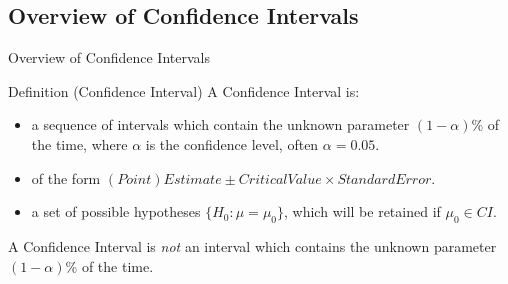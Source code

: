 \documentclass[t,xcolor=pdftex,dvipsnames,table]{beamer}
\begin{document}
\subsection[Confidence Intervals]{Overview of Confidence Intervals}
\begin{frame}{Overview of Confidence Intervals}

\begin{block}{Definition (Confidence Interval)}
A Confidence Interval is:
\begin{itemize}
\item a sequence of intervals which contain the unknown parameter $(1-\alpha)$\% of the time, where $\alpha$ is the confidence level, often $\alpha = 0.05$.
\href{https://gauss17gon.shinyapps.io/conf_intervals/}{}
\item of the form $(Point) Estimate \pm Critical Value \times Standard Error$.
\item a set of possible hypotheses $\{ H_{0}: \mu = \mu_{0} \}$, which will be retained if $\mu_{0} \in CI$.
\end{itemize}

\vspace{.5cm}
A Confidence Interval is {\it not} an interval which contains the unknown parameter $(1-\alpha)$\% of the time.
\end{block}
\end{frame}
\end{document}
